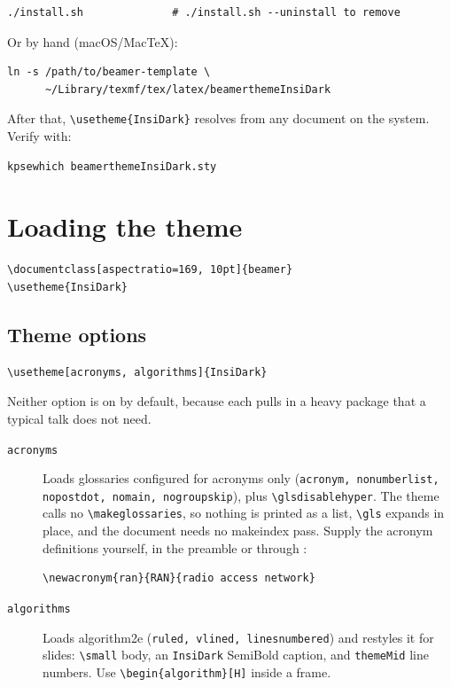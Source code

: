 \documentclass[a4paper,11pt]{article}
\begin{document}
\begin{lstlisting}
./install.sh              # ./install.sh --uninstall to remove
\end{lstlisting}

Or by hand (macOS/MacTeX):

\begin{lstlisting}
ln -s /path/to/beamer-template \
      ~/Library/texmf/tex/latex/beamerthemeInsiDark
\end{lstlisting}

After that, \verb|\usetheme{InsiDark}| resolves from any document on the
system.  Verify with:

\begin{lstlisting}
kpsewhich beamerthemeInsiDark.sty
\end{lstlisting}

\section{Loading the theme}

\begin{lstlisting}
\documentclass[aspectratio=169, 10pt]{beamer}
\usetheme{InsiDark}
\end{lstlisting}

\subsection{Theme options}
\label{sec:options}

\begin{lstlisting}
\usetheme[acronyms, algorithms]{InsiDark}
\end{lstlisting}

Neither option is on by default, because each pulls in a heavy package that a
typical talk does not need.

\begin{description}
	\item[\texttt{acronyms}] Loads \textsf{glossaries} configured for acronyms
	      only (\texttt{acronym, nonumberlist, nopostdot, nomain, nogroupskip}),
	      plus \verb|\glsdisablehyper|.  The theme calls no
	      \verb|\makeglossaries|, so nothing is printed as a list, \verb|\gls|
	      expands in place, and the document needs no \textsf{makeindex} pass.
	      Supply the acronym definitions yourself, in the preamble or through
	      \verb||:
	      \begin{lstlisting}
\newacronym{ran}{RAN}{radio access network}
\end{lstlisting}
	\item[\texttt{algorithms}] Loads \textsf{algorithm2e}
	      (\texttt{ruled, vlined, linesnumbered}) and restyles it for slides:
	      \verb|\small| body, an \texttt{InsiDark} SemiBold caption, and
	      \texttt{themeMid} line numbers.  Use \verb|\begin{algorithm}[H]| inside
	      a frame.
\end{description}
\end{document}
